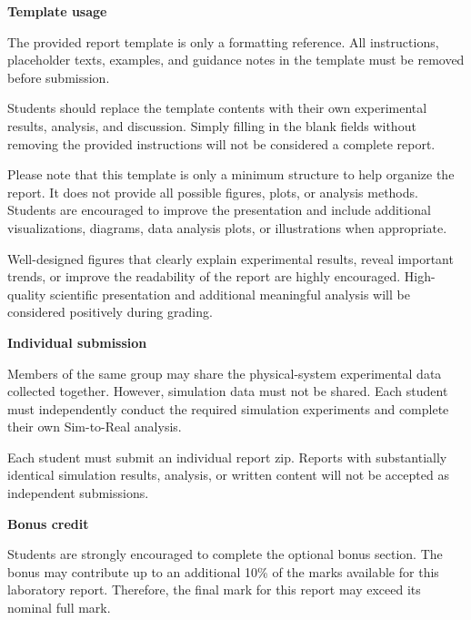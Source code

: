 \documentclass[11pt,a4paper]{article}
\begin{document}
\begin{requirementbox}
\textbf{Template usage}

The provided report template is only a formatting reference. All instructions,
placeholder texts, examples, and guidance notes in the template must be removed
before submission.

Students should replace the template contents with their own experimental
results, analysis, and discussion. Simply filling in the blank fields without
removing the provided instructions will not be considered a complete report.

Please note that this template is only a minimum structure to help organize the
report. It does not provide all possible figures, plots, or analysis methods.
Students are encouraged to improve the presentation and include additional
visualizations, diagrams, data analysis plots, or illustrations when
appropriate.

Well-designed figures that clearly explain experimental results, reveal
important trends, or improve the readability of the report are highly
encouraged. High-quality scientific presentation and additional meaningful
analysis will be considered positively during grading.
\end{requirementbox}
\begin{requirementbox}
\textbf{Individual submission}



Members of the same group may share the physical-system experimental data
collected together. However, simulation data must not be shared. Each student
must independently conduct the required simulation experiments and complete
their own Sim-to-Real analysis.

Each student must submit an individual report zip. Reports with substantially
identical simulation results, analysis, or written content will not be accepted
as independent submissions.
\end{requirementbox}

\begin{requirementbox}
\textbf{Bonus credit}

Students are strongly encouraged to complete the optional bonus section. The
bonus may contribute up to an additional 10\% of the marks available for this
laboratory report. Therefore, the final mark for this report may exceed its
nominal full mark.
\end{requirementbox}
\end{document}
